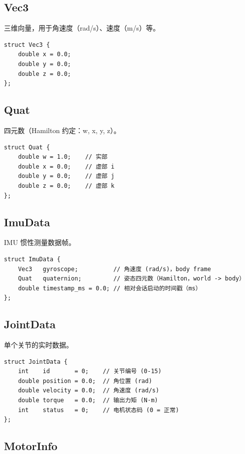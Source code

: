 \documentclass[a4paper,11pt,openany]{book}
\begin{document}
\subsection{Vec3}

三维向量，用于角速度（rad/s）、速度（m/s）等。

\begin{lstlisting}[style=cpp,numbers=none]
struct Vec3 {
    double x = 0.0;
    double y = 0.0;
    double z = 0.0;
};
\end{lstlisting}

\subsection{Quat}

四元数（Hamilton 约定：w, x, y, z）。

\begin{lstlisting}[style=cpp,numbers=none]
struct Quat {
    double w = 1.0;    // 实部
    double x = 0.0;    // 虚部 i
    double y = 0.0;    // 虚部 j
    double z = 0.0;    // 虚部 k
};
\end{lstlisting}

\subsection{ImuData}

IMU 惯性测量数据帧。

\begin{lstlisting}[style=cpp,numbers=none]
struct ImuData {
    Vec3   gyroscope;          // 角速度 (rad/s)，body frame
    Quat   quaternion;         // 姿态四元数（Hamilton，world -> body）
    double timestamp_ms = 0.0; // 相对会话启动的时间戳（ms）
};
\end{lstlisting}

\subsection{JointData}

单个关节的实时数据。

\begin{lstlisting}[style=cpp,numbers=none]
struct JointData {
    int    id       = 0;    // 关节编号 (0-15)
    double position = 0.0;  // 角位置 (rad)
    double velocity = 0.0;  // 角速度 (rad/s)
    double torque   = 0.0;  // 输出力矩 (N·m)
    int    status   = 0;    // 电机状态码 (0 = 正常)
};
\end{lstlisting}

\subsection{MotorInfo}
\end{document}
